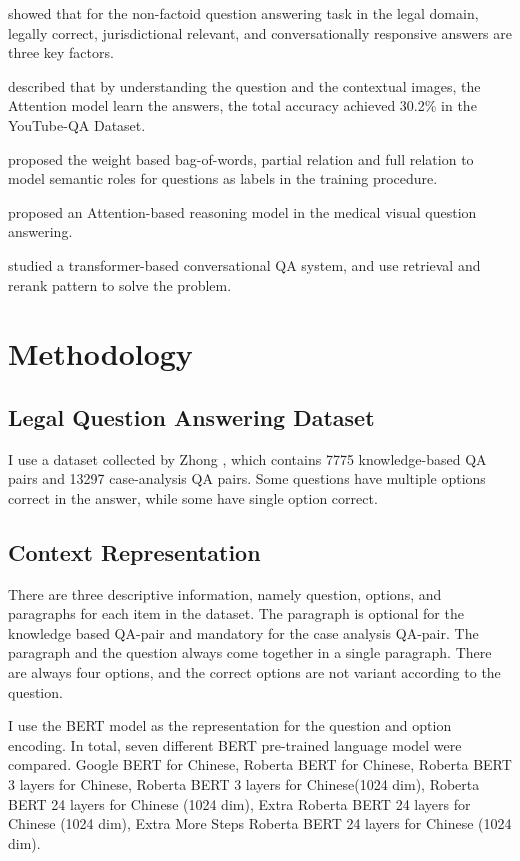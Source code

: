 \documentclass[11pt,a4paper]{article}
\begin{document}
\citet{mcelvain2019non} showed that for the non-factoid question answering task in the legal domain, legally correct, jurisdictional relevant, and conversationally responsive answers
are three key factors.

\citet{jin2019video} described that by understanding the question and the contextual images, the Attention model learn the answers, the total accuracy achieved 30.2\% in the YouTube-QA Dataset.

\citet{pizzato2008indexing} proposed the weight based bag-of-words, partial relation and full relation to model semantic roles for questions as labels in the training procedure.

\citet{zhan2020medical} proposed an Attention-based reasoning model in the medical visual question answering.

\citet{qu2020open} studied a transformer-based conversational QA system, and use retrieval and rerank pattern to solve the problem.

\section{Methodology}
\label{sec:hireachy}



\subsection{Legal Question Answering Dataset}

I use a dataset collected by Zhong \etal, which contains 7775 knowledge-based QA pairs and 13297 case-analysis QA pairs.
Some questions have multiple options correct in the answer, while some have single option correct.


\subsection{Context Representation}

There are three descriptive information, namely question, options, and paragraphs for each item in the dataset.
The paragraph is optional for the knowledge based QA-pair and mandatory for the case analysis QA-pair.
The paragraph and the question always come together in a single paragraph.
There are always four options, and the correct options are not variant according to the question.

I use the BERT model as the representation for the question and option encoding.
In total, seven different BERT pre-trained language model were compared.
Google BERT for Chinese, Roberta BERT for Chinese, Roberta BERT 3 layers for Chinese,
Roberta BERT 3 layers for Chinese(1024 dim), Roberta BERT 24 layers for Chinese (1024 dim),
Extra Roberta BERT 24 layers for Chinese (1024 dim), Extra More Steps Roberta BERT 24 layers for Chinese (1024 dim).
\end{document}
